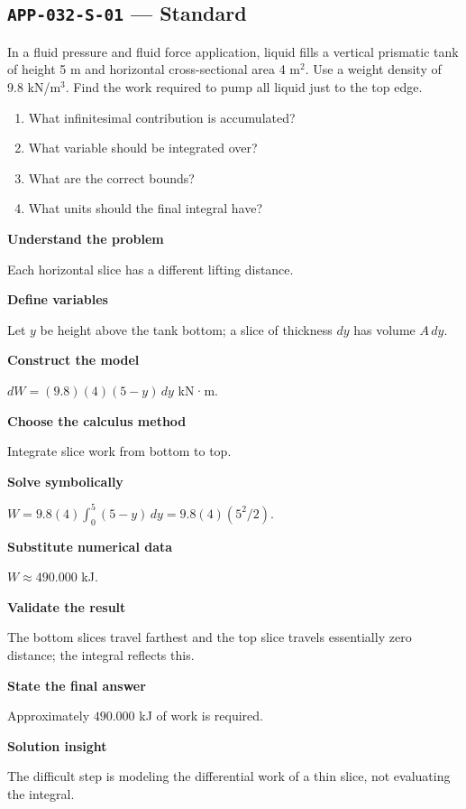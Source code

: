 \documentclass[11pt]{book}
\newcommand{\pid}[1]{\texttt{#1}}
\begin{document}
\subsection*{\pid{APP-032-S-01} — Standard}
\begin{problembox}
In a fluid pressure and fluid force application, liquid fills a vertical prismatic tank of height 5 m and horizontal cross-sectional area 4 m$^2$. Use a weight density of 9.8 kN/m$^3$. Find the work required to pump all liquid just to the top edge.
\end{problembox}
\begin{promptbox}\begin{enumerate}
\item What infinitesimal contribution is accumulated?
\item What variable should be integrated over?
\item What are the correct bounds?
\item What units should the final integral have?
\end{enumerate}\end{promptbox}
\begin{solutionbox}
\textbf{Understand the problem}\par Each horizontal slice has a different lifting distance.\par\medskip
\textbf{Define variables}\par Let $y$ be height above the tank bottom; a slice of thickness $dy$ has volume $A\,dy$.\par\medskip
\textbf{Construct the model}\par $dW=(9.8)(4)(5-y)\,dy$ kN·m.\par\medskip
\textbf{Choose the calculus method}\par Integrate slice work from bottom to top.\par\medskip
\textbf{Solve symbolically}\par $W=9.8(4)\int_0^{5}(5-y)\,dy=9.8(4)(5^2/2)$.\par\medskip
\textbf{Substitute numerical data}\par $W\approx 490.000$ kJ.\par\medskip
\textbf{Validate the result}\par The bottom slices travel farthest and the top slice travels essentially zero distance; the integral reflects this.\par\medskip
\textbf{State the final answer}\par Approximately $490.000$ kJ of work is required.\par\medskip
\textbf{Solution insight}\par The difficult step is modeling the differential work of a thin slice, not evaluating the integral.\par\medskip
\end{solutionbox}
\end{document}
